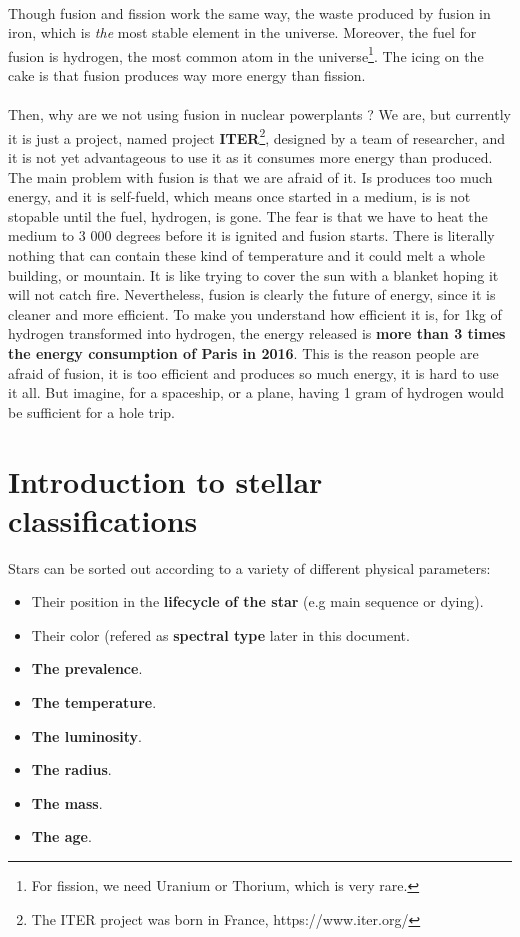 \documentclass[a4paper, 11pt]{article} %
\begin{document}
\paragraph*{}
Though fusion and fission work the same way, the waste produced by fusion in iron, which is \textit{the} most stable element in the universe. Moreover, the fuel for fusion is hydrogen, the most common atom in the universe\footnote{For fission, we need Uranium or Thorium, which is very rare.}. The icing on the cake is that fusion produces way more energy than fission. 
\paragraph*{}
Then, why are we not using fusion in nuclear powerplants ? We are, but currently it is just a project, named project \textbf{ITER}\footnote{The ITER project was born in France, https://www.iter.org/}, designed by a team of researcher, and it is not yet advantageous to use it as it consumes more energy than produced. The main problem with fusion is that we are afraid of it. Is produces too much energy, and it is self-fueld, which means once started in a medium, is is not stopable until the fuel, hydrogen, is gone. The fear is that we have to heat the medium to 3 000 degrees before it is ignited and fusion starts. There is literally nothing that can contain these kind of temperature and it could melt a whole building, or mountain. It is like trying to cover the sun with a blanket hoping it will not catch fire. Nevertheless, fusion is clearly the future of energy, since it is cleaner and more efficient. To make you understand how efficient it is, for 1kg of hydrogen transformed into hydrogen, the energy released is \textbf{more than 3 times the energy consumption of Paris in 2016}. This is the reason people are afraid of fusion, it is too efficient and produces so much energy, it is hard to use it all. But imagine, for a spaceship, or a plane, having 1 gram of hydrogen would be sufficient for a hole trip.

\section{Introduction to stellar classifications}



Stars can be sorted out according to a variety of different physical parameters:

\begin{itemize}
\item Their position in the \textbf{lifecycle of the star} (e.g main sequence or dying).
\item Their color (refered as \textbf{spectral type} later in this document.
\item \textbf{The prevalence}.
\item \textbf{The temperature}. 
\item \textbf{The luminosity}.
\item \textbf{The radius}.
\item \textbf{The mass}.
\item \textbf{The age}.
\end{itemize}
\end{document}
